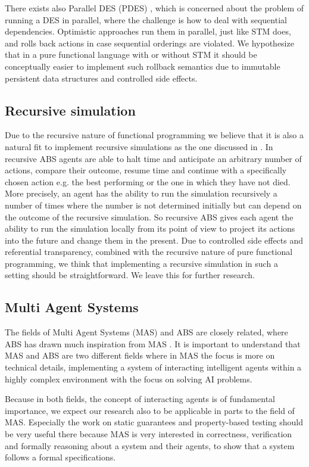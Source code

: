 There exists also Parallel DES (PDES) \cite{fujimoto_parallel_2017}, which is concerned about the problem of running a DES in parallel, where the challenge is how to deal with sequential dependencies. Optimistic approaches run them in parallel, just like STM does, and rolls back actions in case sequential orderings are violated. We hypothesize that in a pure functional language with or without STM it should be conceptually easier to implement such rollback semantics due to immutable persistent data structures and controlled side effects.
 
\subsection{Recursive simulation}
Due to the recursive nature of functional programming we believe that it is also a natural fit to implement recursive simulations as the one discussed in \cite{gilmer_recursive_2000}. In recursive ABS agents are able to halt time and anticipate an arbitrary number of actions, compare their outcome, resume time and continue with a specifically chosen action e.g. the best performing or the one in which they have not died. More precisely, an agent has the ability to run the simulation recursively a number of times where the number is not determined initially but can depend on the outcome of the recursive simulation. So recursive ABS gives each agent the ability to run the simulation locally from its point of view to project its actions into the future and change them in the present. Due to controlled side effects and referential transparency, combined with the recursive nature of pure functional programming, we think that implementing a recursive simulation in such a setting should be straightforward. We leave this for further research.

\subsection{Multi Agent Systems}
The fields of Multi Agent Systems (MAS) and ABS are closely related, where ABS has drawn much inspiration from MAS \cite{weiss_multiagent_2013,wooldridge_introduction_2009}. It is important to understand that MAS and ABS are two different fields where in MAS the focus is more on technical details, implementing a system of interacting intelligent agents within a highly complex environment with the focus on solving AI problems.

Because in both fields, the concept of interacting agents is of fundamental importance, we expect our research also to be applicable in parts to the field of MAS. Especially the work on static guarantees and property-based testing should be very useful there because MAS is very interested in correctness, verification and formally reasoning about a system and their agents, to show that a system follows a formal specifications.